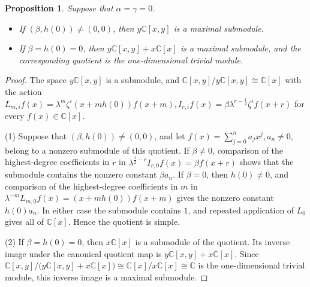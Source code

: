 \documentclass[12pt,reqno]{amsart}
\def\C{\mathbb{C}}
\numberwithin{equation}{section}
\newtheorem{prop}[theo]{Proposition}
\begin{document}
\begin{prop}\label{prop 5.2}
Suppose that $\alpha=\gamma=0$.
\begin{itemize}
    \item[(1)]  If $(\beta,h(0))\ne(0,0)$, then $y\mathbb C[x,y]$ is a maximal submodule.
    \item[(2)] If $\beta=h(0)=0$, then $y\mathbb C[x,y]+x\mathbb C[x]$ is a maximal submodule, and the corresponding quotient is the one-dimensional trivial module.
\end{itemize}
\end{prop}
\begin{proof}
The space $y\mathbb C[x,y]$ is a submodule, and $\C[x,y]/y\C[x,y]\cong \C[x]$ 
with the action $L_{m,i}f(x)
=\lambda^m\zeta^i(x+mh(0))f(x+m),
I_{r,i}f(x)
=\beta\lambda^{r-\frac12}\zeta^if(x+r)$ for every $f(x)\in\mathbb C[x]$.


\rm(1) Suppose that $(\beta,h(0))\ne(0,0)$, and let
$f(x)=\sum_{j=0}^{n}a_jx^j, a_n\ne0$,
belong to a nonzero submodule of this quotient. If $\beta\ne0$, comparison of the highest-degree coefficients in $r$ in
$\lambda^{\frac12-r}I_{r,0}f(x)=\beta f(x+r)$
shows that the submodule contains the nonzero constant $\beta a_n$. If $\beta=0$, then $h(0)\ne0$, and comparison of the highest-degree coefficients in $m$ in
$\lambda^{-m}L_{m,0}f(x)=(x+mh(0))f(x+m)$
gives the nonzero constant $h(0)a_n$. In either case the submodule contains $1$, and repeated application of $L_{0}$ gives all of $\mathbb C[x]$. Hence the quotient is simple.

\rm(2) If $\beta=h(0)=0$, then $x\mathbb C[x]$ is a submodule of the quotient. Its inverse image under the canonical quotient map is $y\mathbb C[x,y]+x\mathbb C[x]$. Since
$\mathbb C[x,y]\big/\bigl(y\mathbb C[x,y]+x\mathbb C[x]\bigr)
 \cong \mathbb C[x]/x\mathbb C[x]\cong \C
$
is the one-dimensional trivial module, this inverse image is a maximal submodule.











    
\end{proof}
\end{document}
